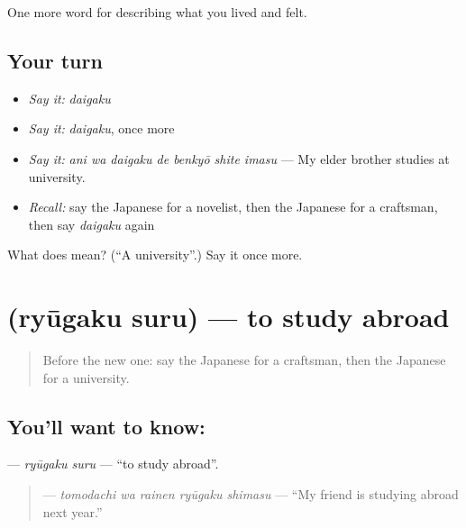 \begin{grammarlens}[title={What you've built}]
One more word for describing what you lived and felt.
\end{grammarlens}

\subsection*{Your turn}
\begin{itemize}
\raggedright
  \item \emph{Say it:} \emph{daigaku}
  \item \emph{Say it:} \emph{daigaku}, once more
  \item \emph{Say it:} \emph{ani wa daigaku de benkyō shite imasu} — My elder brother studies at university.
  \item \emph{Recall:} say the Japanese for a novelist, then the Japanese for a craftsman, then say \emph{daigaku} again
\end{itemize}

\begin{tcolorbox}[breakable,colback=teal!4,colframe=teal!35!black,title={Before you move on}]
What does  mean? (\textquotedblleft{}A university\textquotedblright{}.) Say it once more.
\end{tcolorbox}
\section[\texorpdfstring{\ja{りゅうがくする} (ryūgaku suru)}{りゅうがくする (ryūgaku suru)}]{ (ryūgaku suru) — to study abroad}

\label{lesson:JA-C459-ryuugaku-suru}



\begin{quote}
Before the new one: say the Japanese for a craftsman, then the Japanese for a university.
\end{quote}

\subsection*{You'll want to know: }
\textbf{} — \emph{ryūgaku suru} — \textquotedblleft{}to study abroad\textquotedblright{}.

\begin{quote}
\textbf{  } — \emph{tomodachi wa rainen ryūgaku shimasu} — \textquotedblleft{}My friend is studying abroad next year.\textquotedblright{}
\end{quote}

